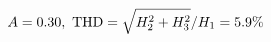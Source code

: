 \documentclass[preview]{standalone}
\begin{document}
\begin{align*}
\special{dvisvgm:raw <g id='unique000'>}A=0.30,\ \text{THD}=\sqrt{H_2^2+H_3^2}/H_1=5.9\%\special{dvisvgm:raw </g>}
\end{align*}
\end{document}
